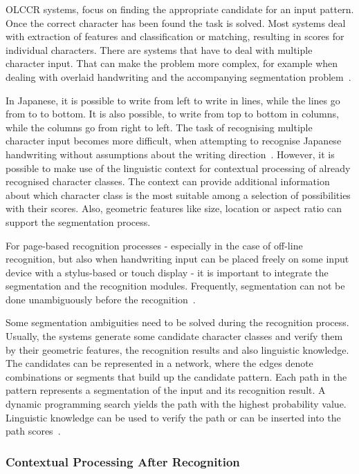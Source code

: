 OLCCR systems, focus on finding the appropriate candidate for an input pattern.
Once the correct character has been found the task is solved. Most systems
deal with extraction of features and classification or matching, resulting in 
scores for individual characters. There are systems that have to deal with 
multiple character input. That can make the problem more complex, 
for example when dealing with overlaid handwriting and the accompanying 
segmentation problem~. 

In Japanese, it is possible to write from left to write in lines, 
while the lines go from to to bottom. It is also possible, to write from top 
to bottom in columns, while the columns go from right to left. 
The task of recognising multiple character input becomes more difficult,
when attempting to recognise Japanese handwriting without assumptions about the
writing direction~. 
However, it is possible to make use of the linguistic context for contextual 
processing of already recognised character classes.
The context can provide additional information about which character class is
the most suitable among a selection of possibilities with their scores.
Also, geometric features like size, location or aspect ratio can support the 
segmentation process. 

For page-based recognition processes - especially in the case of off-line 
recognition, but also when handwriting input can be placed freely on some
input device with a stylus-based or touch display - it is important to integrate
the segmentation and the recognition modules. Frequently, segmentation can not
be done unambiguously before the recognition~.

Some segmentation ambiguities need to be solved during the recognition process.
Usually, the systems generate some candidate character classes and verify them
by their geometric features, the recognition results and also linguistic 
knowledge. The candidates can be represented in a network, where the edges denote
combinations or segments that build up the candidate pattern.
Each path in the pattern represents a segmentation of the input and its 
recognition result. A dynamic programming search yields the path with the highest
probability value. Linguistic knowledge can be used to verify the path or
can be inserted into the path scores~.

\subsubsection{Contextual Processing After Recognition}
\label{sec:olccr:contextualprocessingafter}


